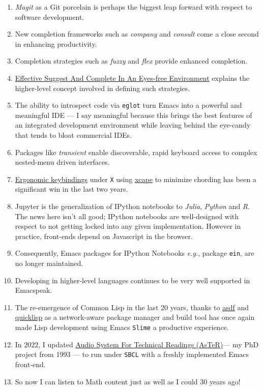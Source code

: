 \documentclass[11pt]{article}
\begin{document}
\begin{enumerate}
\item \emph{Magit}  as a Git porcelain is perhaps the biggest leap forward
with respect to software development.
\item New completion frameworks such as \emph{company} and \emph{consult} come a
close second in enhancing productivity.
\item Completion strategies such as  \emph{fuzzy} and
\emph{flex} provide  enhanced completion.
\item \href{https://emacspeak.blogspot.com/2018/06/effective-suggest-and-complete-in-eyes.html}{Effective Suggest And Complete In An Eyes-free Environment}
explains the higher-level concept  involved in defining such strategies.

\item The ability to introspect code via  \texttt{eglot} 
 turn Emacs into a powerful and meaningful IDE ---  I say
meaningful because this brings the best features of an integrated
development environment while leaving behind the eye-candy that
tends to bloat commercial IDEs.
\item Packages like \emph{transient}  enable discoverable, rapid keyboard access to
complex nested-menu driven interfaces.
\item \href{https://emacspeak.blogspot.com/2023/09/emacs-ergonomics-dont-punish-your.html}{Ergonomic keybindings} under \texttt{X} using \href{https://github.com/alols/xcape}{xcape} to minimize
chording has been  a significant win in the last two years.
\item Jupyter is the   generalization of IPython notebooks to \emph{Julia}, \emph{Python}
and \emph{R}. The news here isn't all good; IPython notebooks are
well-designed with respect to not getting locked into any given
implementation. However in practice,  front-ends
depend on Javascript in the  browser.
\item Consequently,  Emacs  packages  for IPython
Notebooks \emph{e.g.}, package \texttt{ein},  are no longer maintained.
\item Developing in higher-level languages continues to be very well
supported in Emacspeak.
\item The re-emergence of Common Lisp in the last 20 years, thanks to
\href{https://asdf.common-lisp.dev/asdf.html}{asdf} and \href{https://www.quicklisp.org/}{quicklisp} as a network-aware package manager and build
tool has once again made Lisp development using Emacs \texttt{Slime} a
productive experience.
\item In 2022, I updated \href{https://emacspeak.blogspot.com/2022/12/aster-spoken-math-on-emacspeak-audio\_21.html}{Audio System For Technical
Readings (AsTeR)}--- my PhD project from 1993 --- to run under \texttt{SBCL}
with a freshly implemented Emacs front-end.
\item So now I can listen to Math content just as well as I could 30
years ago!
\end{enumerate}
\end{document}
